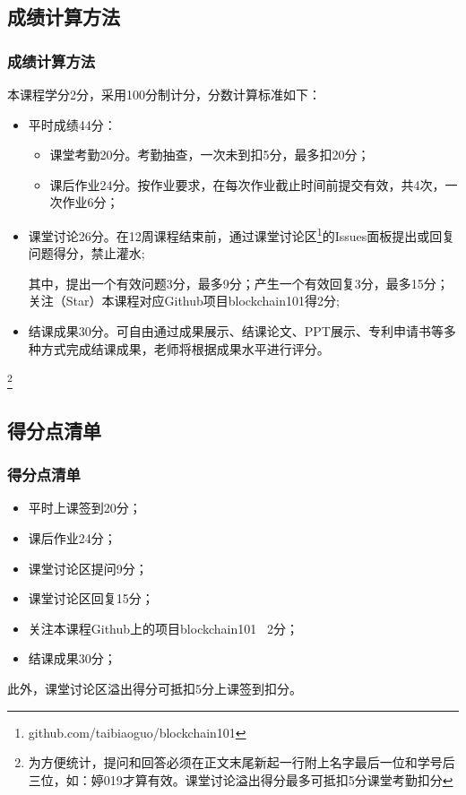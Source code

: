 \documentclass[11pt]{beamer}
\begin{document}
\subsection{成绩计算方法}
\begin{frame}
	\frametitle{成绩计算方法}
	本课程学分2分，采用100分制计分，分数计算标准如下：
	\begin{itemize}
		\item 平时成绩44分：
		      \begin{itemize}
			      \item 课堂考勤20分。考勤抽查，一次未到扣5分，最多扣20分；
			      \item 课后作业24分。按作业要求，在每次作业截止时间前提交有效，共4次，一次作业6分；
		      \end{itemize}
		\item 课堂讨论26分。在12周课程结束前，通过课堂讨论区\footnote{github.com/taibiaoguo/blockchain101}的Issues面板提出或回复问题得分，禁止灌水;

		      其中，提出一个有效问题3分，最多9分；产生一个有效回复3分，最多15分；关注（Star）本课程对应Github项目blockchain101得2分;
		\item 结课成果30分。可自由通过成果展示、结课论文、PPT展示、专利申请书等多种方式完成结课成果，老师将根据成果水平进行评分。
	\end{itemize}
	\footnote{为方便统计，提问和回答必须在正文末尾新起一行附上名字最后一位和学号后三位，如：婷019才算有效。课堂讨论溢出得分最多可抵扣5分课堂考勤扣分}
\end{frame}

\subsection{得分点清单}
\begin{frame}
	\frametitle{得分点清单}
	\begin{itemize}
		\item 平时上课签到20分；
		\item 课后作业24分；
		\item 课堂讨论区提问9分；
		\item 课堂讨论区回复15分；
		\item 关注本课程Github上的项目blockchain101 \ 2分；
		\item 结课成果30分；
	\end{itemize}
	此外，课堂讨论区溢出得分可抵扣5分上课签到扣分。
\end{frame}
\end{document}
